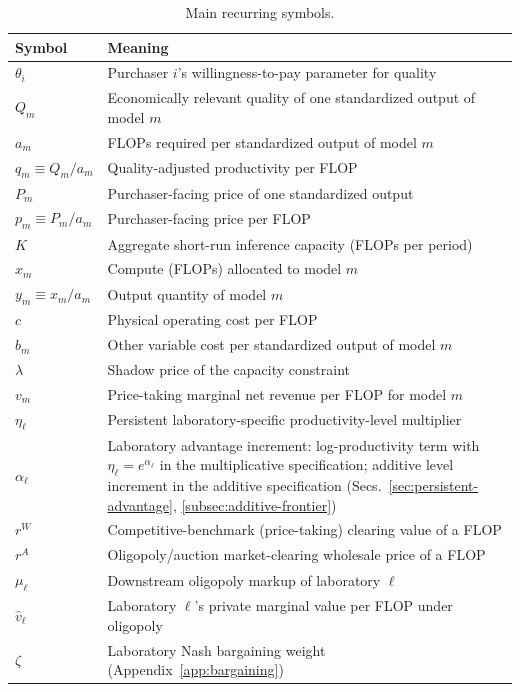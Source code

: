 \documentclass[11pt]{article}
\begin{document}
\begin{table}[htbp]
\centering
\caption{Main recurring symbols.}
\label{tab:notation}
\small
\begin{tabular}{l>{\raggedright\arraybackslash}p{4.4in}}
\hline
Symbol & Meaning \\
\hline
$\theta_i$ & Purchaser $i$'s willingness-to-pay parameter for quality \\
$Q_m$ & Economically relevant quality of one standardized output of model $m$ \\
$a_m$ & FLOPs required per standardized output of model $m$ \\
$q_m\equiv Q_m/a_m$ & Quality-adjusted productivity per FLOP \\
$P_m$ & Purchaser-facing price of one standardized output \\
$p_m\equiv P_m/a_m$ & Purchaser-facing price per FLOP \\
$K$ & Aggregate short-run inference capacity (FLOPs per period) \\
$x_m$ & Compute (FLOPs) allocated to model $m$ \\
$y_m\equiv x_m/a_m$ & Output quantity of model $m$ \\
$c$ & Physical operating cost per FLOP \\
$b_m$ & Other variable cost per standardized output of model $m$ \\
$\lambda$ & Shadow price of the capacity constraint \\
$v_m$ & Price-taking marginal net revenue per FLOP for model $m$ \\
$\eta_\ell$ & Persistent laboratory-specific productivity-level multiplier \\
$\alpha_\ell$ & Laboratory advantage increment: log-productivity term with $\eta_\ell=e^{\alpha_\ell}$ in the multiplicative specification; additive level increment in the additive specification (Secs.~\ref{sec:persistent-advantage}, \ref{subsec:additive-frontier}) \\
$r^W$ & Competitive-benchmark (price-taking) clearing value of a FLOP \\
$r^A$ & Oligopoly/auction market-clearing wholesale price of a FLOP \\
$\mu_\ell$ & Downstream oligopoly markup of laboratory $\ell$ \\
$\widehat v_\ell$ & Laboratory $\ell$'s private marginal value per FLOP under oligopoly \\
$\zeta$ & Laboratory Nash bargaining weight (Appendix~\ref{app:bargaining}) \\

\end{tabular}
\end{table}
\end{document}
